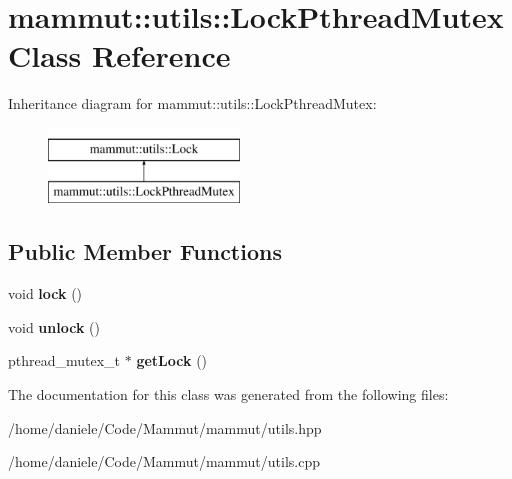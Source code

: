\hypertarget{classmammut_1_1utils_1_1LockPthreadMutex}{\section{mammut\-:\-:utils\-:\-:Lock\-Pthread\-Mutex Class Reference}
\label{classmammut_1_1utils_1_1LockPthreadMutex}
}
Inheritance diagram for mammut\-:\-:utils\-:\-:Lock\-Pthread\-Mutex\-:\begin{figure}[H]
\begin{center}
\leavevmode
\includegraphics[height=2.000000cm]{classmammut_1_1utils_1_1LockPthreadMutex}
\end{center}
\end{figure}
\subsection*{Public Member Functions}
\begin{DoxyCompactItemize}
\item 
\hypertarget{classmammut_1_1utils_1_1LockPthreadMutex_a4165efbee89fe51a5511679bdfa4b56b}{void {\bfseries lock} ()}\label{classmammut_1_1utils_1_1LockPthreadMutex_a4165efbee89fe51a5511679bdfa4b56b}

\item 
\hypertarget{classmammut_1_1utils_1_1LockPthreadMutex_a195edaf5469a611491cd0b3afe6c43e0}{void {\bfseries unlock} ()}\label{classmammut_1_1utils_1_1LockPthreadMutex_a195edaf5469a611491cd0b3afe6c43e0}

\item 
\hypertarget{classmammut_1_1utils_1_1LockPthreadMutex_a7c4b461e9e687a7676bdb444ea802dc1}{pthread\-\_\-mutex\-\_\-t $\ast$ {\bfseries get\-Lock} ()}\label{classmammut_1_1utils_1_1LockPthreadMutex_a7c4b461e9e687a7676bdb444ea802dc1}

\end{DoxyCompactItemize}


The documentation for this class was generated from the following files\-:\begin{DoxyCompactItemize}
\item 
/home/daniele/\-Code/\-Mammut/mammut/utils.\-hpp\item 
/home/daniele/\-Code/\-Mammut/mammut/utils.\-cpp\end{DoxyCompactItemize}
